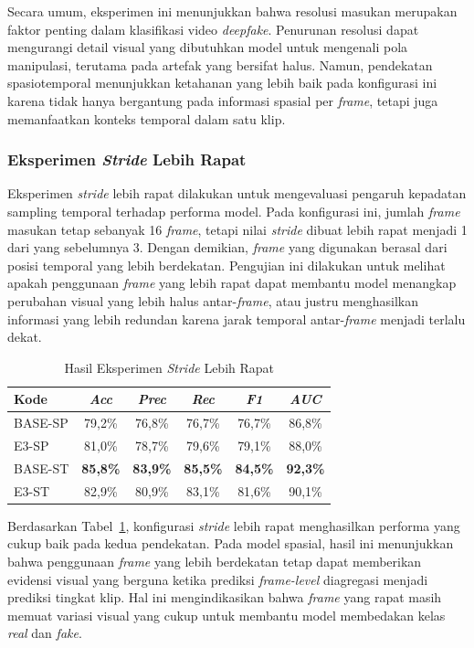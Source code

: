 Secara umum, eksperimen ini menunjukkan bahwa resolusi masukan merupakan faktor penting dalam klasifikasi video \textit{deepfake}. Penurunan resolusi dapat mengurangi detail visual yang dibutuhkan model untuk mengenali pola manipulasi, terutama pada artefak yang bersifat halus. Namun, pendekatan spasiotemporal menunjukkan ketahanan yang lebih baik pada konfigurasi ini karena tidak hanya bergantung pada informasi spasial per \textit{frame}, tetapi juga memanfaatkan konteks temporal dalam satu klip.

\subsubsection{Eksperimen \textit{Stride} Lebih Rapat} \label{IV.Eksperimen_Utama_Stride}

Eksperimen \textit{stride} lebih rapat dilakukan untuk mengevaluasi pengaruh kepadatan sampling temporal terhadap performa model. Pada konfigurasi ini, jumlah \textit{frame} masukan tetap sebanyak 16 \textit{frame}, tetapi nilai \textit{stride} dibuat lebih rapat menjadi 1 dari yang sebelumnya 3. Dengan demikian, \textit{frame} yang digunakan berasal dari posisi temporal yang lebih berdekatan. Pengujian ini dilakukan untuk melihat apakah penggunaan \textit{frame} yang lebih rapat dapat membantu model menangkap perubahan visual yang lebih halus antar-\textit{frame}, atau justru menghasilkan informasi yang lebih redundan karena jarak temporal antar-\textit{frame} menjadi terlalu dekat.

\begin{table}[htbp]
\centering
\caption{Hasil Eksperimen \textit{Stride} Lebih Rapat}
\label{table:4.eksperimen-utama-stride}
\begin{tabular}{lccccc}
\toprule
\textbf{Kode} &
\textbf{\textit{Acc}} &
\textbf{\textit{Prec}} &
\textbf{\textit{Rec}} &
\textbf{\textit{F1}} &
\textbf{\textit{AUC}} \\
\midrule
BASE-SP & 79,2\% & 76,8\% & 76,7\% & 76,7\% & 86,8\% \\
E3-SP & 81,0\% & 78,7\% & 79,6\% & 79,1\% & 88,0\% \\
\midrule
BASE-ST & \textbf{85,8\%} & \textbf{83,9\%} & \textbf{85,5\%} & \textbf{84,5\%} & \textbf{92,3\%} \\
E3-ST & 82,9\% & 80,9\% & 83,1\% & 81,6\% & 90,1\% \\
\bottomrule
\end{tabular}
\end{table}

Berdasarkan Tabel~\ref{table:4.eksperimen-utama-stride}, konfigurasi \textit{stride} lebih rapat menghasilkan performa yang cukup baik pada kedua pendekatan. Pada model spasial, hasil ini menunjukkan bahwa penggunaan \textit{frame} yang lebih berdekatan tetap dapat memberikan evidensi visual yang berguna ketika prediksi \textit{frame-level} diagregasi menjadi prediksi tingkat klip. Hal ini mengindikasikan bahwa \textit{frame} yang rapat masih memuat variasi visual yang cukup untuk membantu model membedakan kelas \textit{real} dan \textit{fake}.

